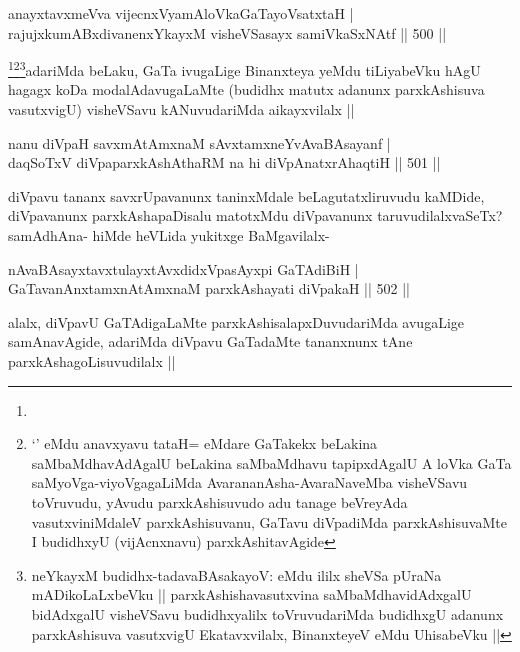 
\begin{shl}
anayxtavxmeVva vijecnxVyamAloVkaGaTayoVsatxtaH | \\
rajujxkumABxdivanenxYkayxM visheVSasayx samiVkaSxNAtf \hfill||  500 ||  
\end{shl}

\begin{artha}
\footnote{ }\footnote{`\stext' eMdu anavxyavu tataH= eMdare GaTakekx beLakina saMbaMdhavAdAgalU beLakina saMbaMdhavu tapipxdAgalU A loVka GaTa saMyoVga-viyoVgagaLiMda AvarananAsha-AvaraNaveMba visheVSavu toVruvudu, yAvudu parxkAshisuvudo adu tanage beVreyAda vasutxviniMdaleV parxkAshisuvanu, GaTavu diVpadiMda parxkAshisuvaMte I budidhxyU (vijAcnxnavu) parxkAshitavAgide }\footnote{neYkayxM budidhx-tadavaBAsakayoV: eMdu ililx sheVSa pUraNa mADikoLaLxbeVku || parxkAshishavasutxvina saMbaMdhavidAdxgalU bidAdxgalU visheVSavu budidhxyalilx toVruvudariMda budidhxgU adanunx parxkAshisuva vasutxvigU Ekatavxvilalx, BinanxteyeV eMdu UhisabeVku ||}adariMda beLaku, GaTa ivugaLige Binanxteya yeMdu tiLiyabeVku hAgU hagagx koDa modalAdavugaLaMte (budidhx matutx adanunx parxkAshisuva vasutxvigU) visheVSavu kANuvudariMda aikayxvilalx ||
\end{artha}


\begin{shl}
nanu diVpaH savxmAtAmxnaM sAvxtamxneYvAvaBAsayanf | \\
daqSoTxV diVpaparxkAshAthaRM na hi diVpAnatxrAhaqtiH \hfill||  501 ||  
\end{shl}

\begin{artha}
diVpavu tananx savxrUpavanunx taninxMdale beLagutatxliruvudu kaMDide, diVpavanunx parxkAshapaDisalu matotxMdu diVpavanunx taruvudilalxvaSeTx? samAdhAna- hiMde heVLida yukitxge BaMgavilalx-
\end{artha}

\begin{shl}
nAvaBAsayxtavxtulayxtAvxdidxVpasAyxpi GaTAdiBiH | \\
GaTavanAnx\s \s tamxnA\s \s tAmxnaM parxkAshayati diVpakaH \hfill||  502 ||  
\end{shl}

\begin{artha}
alalx, diVpavU GaTAdigaLaMte parxkAshisalapxDuvudariMda avugaLige samAnavAgide, adariMda diVpavu GaTadaMte tananxnunx tAne parxkAshagoLisuvudilalx ||
\end{artha}

